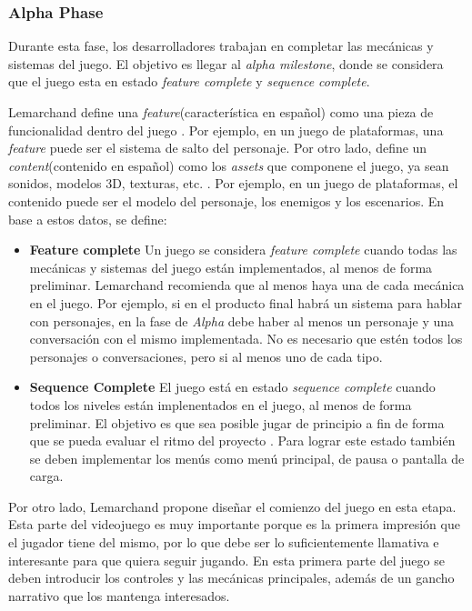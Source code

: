 \subsubsection{Alpha Phase}
\par Durante esta fase, los desarrolladores trabajan en completar las mecánicas y sistemas del juego. El objetivo es llegar al \textit{alpha milestone}, donde se considera que el juego esta en estado \textit{feature complete} y \textit{sequence complete}.
\par Lemarchand define una \textit{feature}(característica en español) como una pieza de funcionalidad dentro del juego \cite{lemarchandPlayfulProductionProcess2021}. Por ejemplo, en un juego de plataformas, una \textit{feature} puede ser el sistema de salto del personaje. Por otro lado, define un \textit{content}(contenido en español) como los \textit{assets} que componene el juego, ya sean sonidos, modelos 3D, texturas, etc. \cite{lemarchandPlayfulProductionProcess2021}. Por ejemplo, en un juego de plataformas, el contenido puede ser el modelo del personaje, los enemigos y los escenarios. En base a estos datos, se define:
\begin{itemize}
    \item \textbf{Feature complete} Un juego se considera \textit{feature complete} cuando todas las mecánicas y sistemas del juego están implementados, al menos de forma preliminar. Lemarchand recomienda que al menos haya una de cada mecánica en el juego. Por ejemplo, si en el producto final habrá un sistema para hablar con personajes, en la fase de \textit{Alpha} debe haber al menos un personaje y una conversación con el mismo implementada. No es necesario que estén todos los personajes o conversaciones, pero si al menos uno de cada tipo.
    \item \textbf{Sequence Complete} El juego está en estado \textit{sequence complete} cuando todos los niveles están implenentados en el juego, al menos de forma preliminar. El objetivo es que sea posible jugar de principio a fin de forma que se pueda evaluar el ritmo del proyecto \cite{lemarchandPlayfulProductionProcess2021} . %
    Para lograr este estado también se deben implementar los menús como menú principal, de pausa o pantalla de carga.
\end{itemize}
\par Por otro lado, Lemarchand propone diseñar el comienzo del juego en esta etapa. Esta parte del videojuego es muy importante porque es la primera impresión que el jugador tiene del mismo, por lo que debe ser lo suficientemente llamativa e interesante para que quiera seguir jugando. En esta primera parte del juego se deben introducir los controles y las mecánicas principales, además de un gancho narrativo que los mantenga interesados.  %
